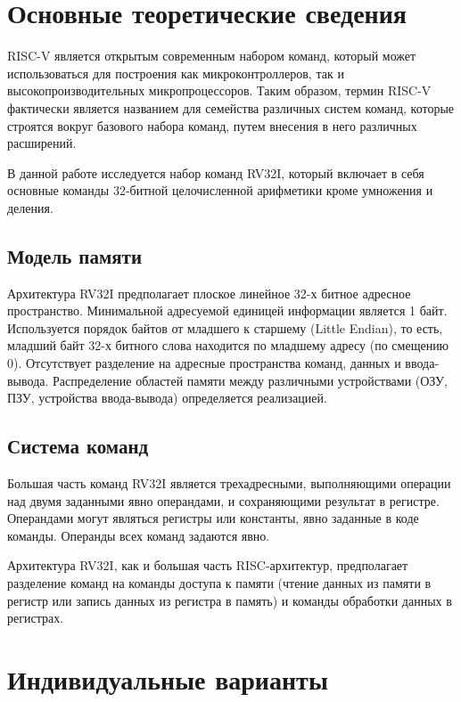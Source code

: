 \chapter{Основные теоретические сведения}
RISC-V является открытым современным набором команд, который может использоваться для построения как микроконтроллеров, так и высокопроизводительных микропроцессоров. Таким образом, термин RISC-V фактически является названием для семейства различных систем команд, которые строятся вокруг базового набора команд, путем внесения в него различных расширений.

В данной работе исследуется набор команд RV32I, который включает в себя основные команды 32-битной целочисленной арифметики кроме умножения и деления. 

\section{Модель памяти}
Архитектура RV32I предполагает плоское линейное 32-х битное адресное пространство. Минимальной адресуемой единицей информации является 1 байт. Используется порядок байтов от младшего к старшему (Little Endian), то есть, младший байт 32-х битного слова находится по младшему адресу (по смещению 0). Отсутствует разделение на адресные пространства команд, данных и ввода-вывода. Распределение областей памяти между различными устройствами (ОЗУ, ПЗУ, устройства ввода-вывода) определяется реализацией.

\section{Система команд}
Большая часть команд RV32I является трехадресными, выполняющими операции над двумя заданными явно операндами, и сохраняющими результат в регистре. Операндами могут являться регистры или константы, явно заданные в коде команды. Операнды всех команд задаются явно. 

Архитектура RV32I, как и большая часть RISC-архитектур, предполагает разделение команд на команды доступа к памяти (чтение данных из памяти в регистр или запись данных из регистра в память) и команды обработки данных в регистрах.

\chapter{Индивидуальные варианты}

